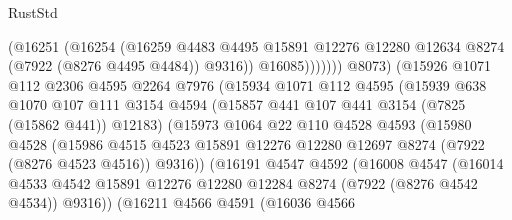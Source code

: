\begin{lexlean}{RustStd}
\begin{coremodule}
                                (@16251
                                  (@16254
                                    (@16259
                                      @4483
                                      @4495
                                      @15891
                                      @12276
                                      @12280
                                      @12634
                                      @8274
                                      (@7922 (@8276 @4495 @4484))
                                      @9316))
                                  @16085)))))))
                    @8073)
                  (@15926
                    @1071
                    @112
                    @2306
                    @4595
                    @2264
                    @7976
                    (@15934
                      @1071
                      @112
                      @4595
                      (@15939
                        @638
                        @1070
                        @107
                        @111
                        @3154
                        @4594
                        (@15857 @441 @107 @441 @3154 (@7825 (@15862 @441)) @12183)
                        (@15973
                          @1064
                          @22
                          @110
                          @4528
                          @4593
                          (@15980
                            @4528
                            (@15986
                              @4515
                              @4523
                              @15891
                              @12276
                              @12280
                              @12697
                              @8274
                              (@7922 (@8276 @4523 @4516))
                              @9316))
                          (@16191
                            @4547
                            @4592
                            (@16008
                              @4547
                              (@16014
                                @4533
                                @4542
                                @15891
                                @12276
                                @12280
                                @12284
                                @8274
                                (@7922 (@8276 @4542 @4534))
                                @9316))
                            (@16211
                              @4566
                              @4591
                              (@16036
                                @4566

\end{coremodule}
\end{lexlean}
